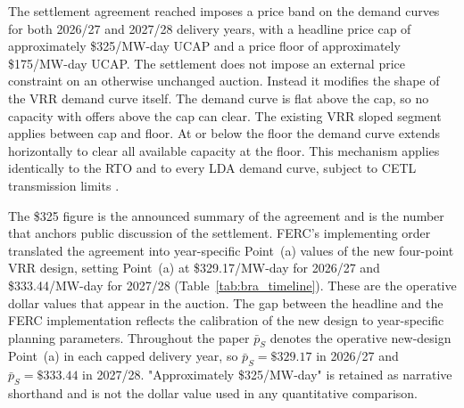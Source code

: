 \label{subsec:inst_shapiro}%
The settlement agreement reached imposes a price band on
the demand curves for both 2026/27 and 2027/28 delivery years, with
a headline price cap of approximately \$325/MW-day UCAP and a price
floor of approximately \$175/MW-day UCAP. The settlement does not
impose an external price constraint on an otherwise unchanged
auction. Instead it modifies the shape of the VRR demand curve
itself. The demand curve is flat above the cap, so no capacity with
offers above the cap can clear. The existing VRR sloped segment
applies between cap and floor. At or below the floor the demand curve
extends horizontally to clear all available capacity at the floor.
This mechanism applies identically to the RTO and to every LDA demand
curve, subject to CETL transmission limits
\citep{PJM2025_settlement_slides, FERC2025_ER25-1357}.

The \$325 figure is the announced summary of the agreement
and is the number that anchors public discussion of the settlement.
FERC's implementing order \citep{FERC2025_ER25-1357} translated the
agreement into year-specific Point~(a) values of the new four-point
VRR design, setting Point~(a) at \$329.17/MW-day for 2026/27 and
\$333.44/MW-day for 2027/28 (Table~\ref{tab:bra_timeline}). These are
the operative dollar values that appear in the auction. The
gap between the headline and the FERC implementation reflects the
calibration of the new design to year-specific planning parameters.
Throughout the paper $\bar p_S$ denotes the operative new-design
Point~(a) in each capped delivery year, so $\bar p_S = \$329.17$ in
2026/27 and $\bar p_S = \$333.44$ in 2027/28. "Approximately
\$325/MW-day" is retained as narrative shorthand and is not the
dollar value used in any quantitative comparison.
